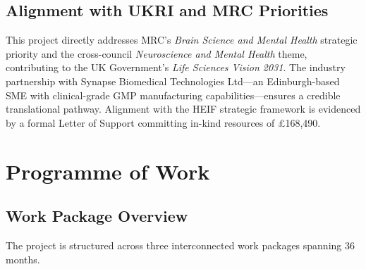 \documentclass[11pt,a4paper]{article}
\begin{document}
\subsection{Alignment with UKRI and MRC Priorities}

This project directly addresses MRC's \emph{Brain Science and Mental Health} strategic
priority and the cross-council \emph{Neuroscience and Mental Health} theme, contributing
to the UK Government's \emph{Life Sciences Vision 2031}. The industry partnership with
Synapse Biomedical Technologies Ltd---an Edinburgh-based SME with clinical-grade GMP
manufacturing capabilities---ensures a credible translational pathway. Alignment with
the HEIF strategic framework is evidenced by a formal Letter of Support committing
in-kind resources of \pounds 168,490.

\section{Programme of Work}

\subsection{Work Package Overview}

The project is structured across three interconnected work packages spanning 36 months.

\vspace{4pt}
\end{document}
